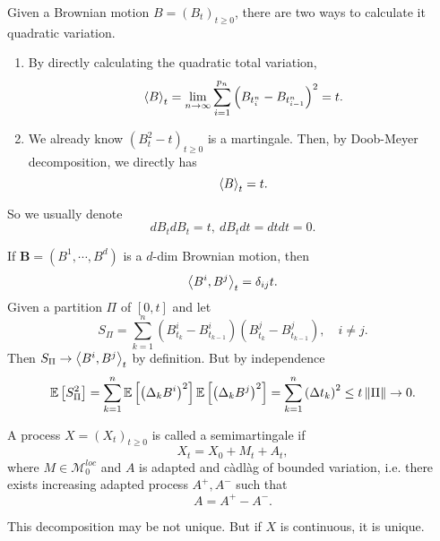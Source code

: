 \begin{exam}
    Given a Brownian motion $B=(B_t)_{t \geq 0}$, there are two ways to calculate it quadratic variation.
    \begin{enumerate}[label=(\arabic{*})]
    	\item By directly calculating the quadratic total variation,
    	\begin{equation*}
    		\left\langle B \right\rangle_t = \lim _{n \rightarrow \infty} \sum_{i=1}^{p_n}\left(B_{t_i^n}-B_{t_{i-1}^n}\right)^2=t.
    	\end{equation*}

    	\item We already know $(B_t^2 - t)_{t \geq 0}$ is a martingale. Then, by Doob-Meyer decomposition, we directly has
    	\begin{equation*}
    		\left\langle B \right\rangle_t = t.
    	\end{equation*}
    \end{enumerate}
    So we usually denote
    \begin{equation*}
    	dB_tdB_t = t,~dB_t dt = dt dt =0.
    \end{equation*}
\end{exam}
\begin{exam}
    If $\bm{B}=(B^1,\cdots,B^d)$ is a $d$-dim Brownian motion, then
    \begin{equation*}
        \left\langle B^i,B^j \right\rangle_t = \delta_{ij}t.
    \end{equation*}
    Given a partition $\Pi$ of $[0,t]$ and let
    \begin{equation*}
        S_\Pi=\sum_{k=1}^n\left(B_{t_k}^i-B_{t_{k-1}}^i\right)\left(B_{t_k}^j-B_{t_{k-1}}^j\right), \quad i \neq j.
    \end{equation*}
    Then $S_\Pi \rightarrow \left\langle B^i,B^j \right\rangle_t$ by definition. But by independence
    \begin{equation*}
        \mathbb{E}\left[S_\Pi^2\right]=\sum_{k=1}^n \mathbb{E}\left[\left(\Delta_k B^i\right)^2\right] \mathbb{E}\left[\left(\Delta_k B^j\right)^2\right]=\sum_{k=1}^n\left(\Delta t_k\right)^2 \leq t\left\lVert\Pi\right\lVert \rightarrow 0 .
    \end{equation*}
\end{exam}

\begin{defn}[Semimartingale]
    A process $X=(X_t)_{t \geq 0}$ is called a semimartingale if 
    \begin{equation*}
    	X_t = X_0 + M_t + A_t,
    \end{equation*}
    where $M \in \mathcal{M}^{loc}_0$ and $A$ is adapted and c\`adl\`ag of bounded variation, i.e. there exists increasing adapted process $A^+,A^-$ such that
    \begin{equation*}
    	A = A^+ - A^-.
    \end{equation*}
\end{defn}
\begin{rmk}
    This decomposition may be not unique. But if $X$ is continuous, it is unique.
\end{rmk}

